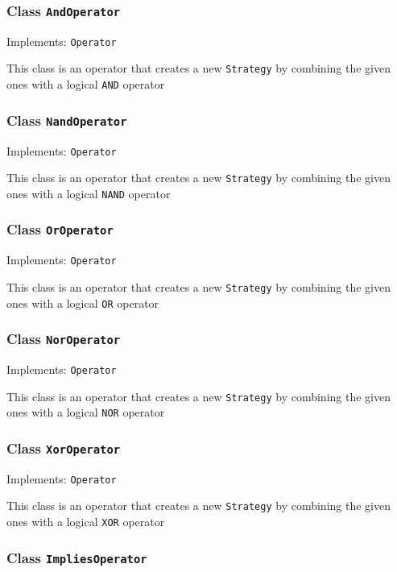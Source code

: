 \documentclass[parskip=full,11pt]{scrartcl}
\begin{document}
\subsubsection{Class \texttt{AndOperator}}

Implements: \texttt{Operator}

This class is an operator that creates a new \texttt{Strategy} by combining the given ones with a logical \texttt{AND} operator

\subsubsection{Class \texttt{NandOperator}}

Implements: \texttt{Operator}

This class is an operator that creates a new \texttt{Strategy} by combining the given ones with a logical \texttt{NAND} operator

\subsubsection{Class \texttt{OrOperator}}

Implements: \texttt{Operator}

This class is an operator that creates a new \texttt{Strategy} by combining the given ones with a logical \texttt{OR} operator

\subsubsection{Class \texttt{NorOperator}}

Implements: \texttt{Operator}

This class is an operator that creates a new \texttt{Strategy} by combining the given ones with a logical \texttt{NOR} operator

\subsubsection{Class \texttt{XorOperator}}

Implements: \texttt{Operator}

This class is an operator that creates a new \texttt{Strategy} by combining the given ones with a logical \texttt{XOR} operator

\subsubsection{Class \texttt{ImpliesOperator}}
\end{document}
